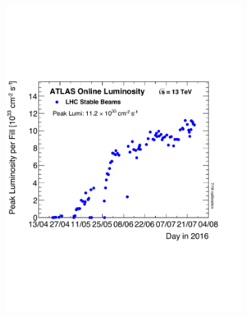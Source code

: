\begin{figure}[t!]
\centering
\begin{subfigure}[t]{0.48\textwidth}
\includegraphics[width=\textwidth]{peakLumiByFill-1}
\end{subfigure}
\begin{subfigure}[t]{0.48\textwidth}

\end{subfigure}
\end{figure}
